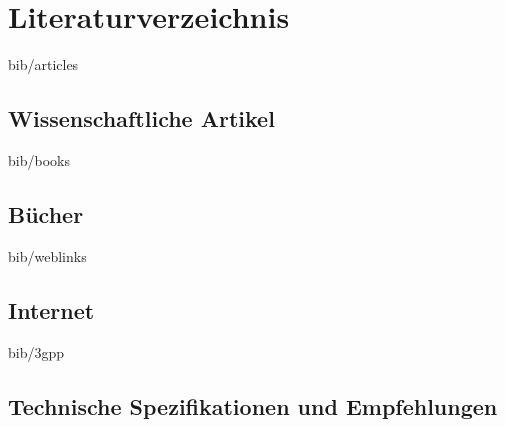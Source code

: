 \chapter*{Literaturverzeichnis}
\begin{btSect}{bib/articles}
\section*{Wissenschaftliche Artikel}
\btPrintCited
\end{btSect}

\begin{btSect}{bib/books}
\section*{Bücher}
\btPrintCited
\end{btSect}

\begin{btSect}{bib/weblinks}
\section*{Internet}
\btPrintCited
\end{btSect}

\begin{btSect}{bib/3gpp}
\section*{Technische Spezifikationen und Empfehlungen}
\btPrintCited
\end{btSect}
